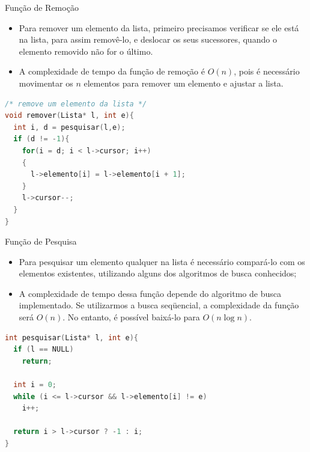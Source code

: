 \begin{frame}[fragile,c]{Função de Remoção} 
	\begin{itemize}
		\item Para remover um elemento da lista, primeiro precisamos verificar se ele está na lista, para assim removê-lo, e deslocar os seus sucessores, quando o elemento removido não for o último.
		\item A complexidade de tempo da função de remoção é $O(n)$, pois é necessário movimentar os $n$ elementos para remover um elemento e ajustar a lista.
	\end{itemize}
	
\footnotesize
\begin{lstlisting}[language=C]
/* remove um elemento da lista */
void remover(Lista* l, int e){     
  int i, d = pesquisar(l,e);
  if (d != -1){
    for(i = d; i < l->cursor; i++)
    {
      l->elemento[i] = l->elemento[i + 1];
    }
    l->cursor--;
  }  
}
\end{lstlisting}	
\end{frame} 

\begin{frame}[fragile]{Função de Pesquisa} 
	\begin{itemize}
		\item Para pesquisar um elemento qualquer na lista é necessário compará-lo com os elementos existentes, utilizando alguns dos algoritmos de busca conhecidos;
		\item A complexidade de tempo dessa função depende do algoritmo de busca implementado. Se utilizarmos a busca seqüencial, a complexidade da função será $O(n)$. No entanto, é possível baixá-lo para $O(n\log n)$.
	\end{itemize}

\footnotesize
\begin{lstlisting}[language=C]
int pesquisar(Lista* l, int e){
  if (l == NULL)
    return;
  
  int i = 0;
  while (i <= l->cursor && l->elemento[i] != e)
    i++;
        
  return i > l->cursor ? -1 : i;
}
\end{lstlisting}
\end{frame}


